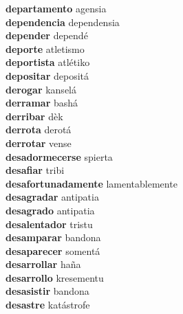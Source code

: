 \textbf{departamento } agensia \\
\textbf{dependencia } dependensia \\
\textbf{depender } dependé \\
\textbf{deporte } atletismo \\
\textbf{deportista } atlétiko \\
\textbf{depositar } depositá \\
\textbf{derogar } kanselá \\
\textbf{derramar } bashá \\
\textbf{derribar } dèk \\
\textbf{derrota } derotá \\
\textbf{derrotar } vense \\
\textbf{desadormecerse } spierta \\
\textbf{desafiar } tribi \\
\textbf{desafortunadamente } lamentablemente \\
\textbf{desagradar } antipatia \\
\textbf{desagrado } antipatia \\
\textbf{desalentador } tristu \\
\textbf{desamparar } bandona \\
\textbf{desaparecer } somentá \\
\textbf{desarrollar } haña \\
\textbf{desarrollo } kresementu \\
\textbf{desasistir } bandona \\
\textbf{desastre } katástrofe \\
